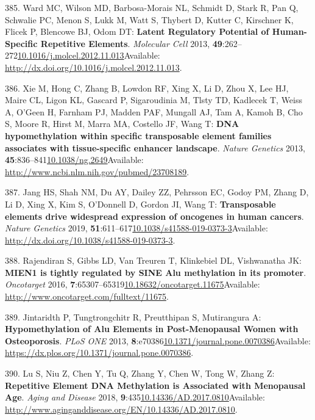 \documentclass[
]{book}
\begin{document}
\leavevmode\hypertarget{ref-Ward2013}{}%
385. Ward MC, Wilson MD, Barbosa-Morais NL, Schmidt D, Stark R, Pan Q, Schwalie PC, Menon S, Lukk M, Watt S, Thybert D, Kutter C, Kirschner K, Flicek P, Blencowe BJ, Odom DT: \textbf{Latent Regulatory Potential of Human-Specific Repetitive Elements}. \emph{Molecular Cell} 2013, \textbf{49}:262--272\href{https://doi.org/10.1016/j.molcel.2012.11.013}{10.1016/j.molcel.2012.11.013}Available: \url{http://dx.doi.org/10.1016/j.molcel.2012.11.013}.

\leavevmode\hypertarget{ref-Xie2013}{}%
386. Xie M, Hong C, Zhang B, Lowdon RF, Xing X, Li D, Zhou X, Lee HJ, Maire CL, Ligon KL, Gascard P, Sigaroudinia M, Tlsty TD, Kadlecek T, Weiss A, O'Geen H, Farnham PJ, Madden PAF, Mungall AJ, Tam A, Kamoh B, Cho S, Moore R, Hirst M, Marra MA, Costello JF, Wang T: \textbf{DNA hypomethylation within specific transposable element families associates with tissue-specific enhancer landscape}. \emph{Nature Genetics} 2013, \textbf{45}:836--841\href{https://doi.org/10.1038/ng.2649}{10.1038/ng.2649}Available: \url{http://www.ncbi.nlm.nih.gov/pubmed/23708189}.

\leavevmode\hypertarget{ref-Jang2019}{}%
387. Jang HS, Shah NM, Du AY, Dailey ZZ, Pehrsson EC, Godoy PM, Zhang D, Li D, Xing X, Kim S, O'Donnell D, Gordon JI, Wang T: \textbf{Transposable elements drive widespread expression of oncogenes in human cancers}. \emph{Nature Genetics} 2019, \textbf{51}:611--617\href{https://doi.org/10.1038/s41588-019-0373-3}{10.1038/s41588-019-0373-3}Available: \url{http://dx.doi.org/10.1038/s41588-019-0373-3}.

\leavevmode\hypertarget{ref-Rajendiran2016}{}%
388. Rajendiran S, Gibbs LD, Van Treuren T, Klinkebiel DL, Vishwanatha JK: \textbf{MIEN1 is tightly regulated by SINE Alu methylation in its promoter}. \emph{Oncotarget} 2016, \textbf{7}:65307--65319\href{https://doi.org/10.18632/oncotarget.11675}{10.18632/oncotarget.11675}Available: \url{http://www.oncotarget.com/fulltext/11675}.

\leavevmode\hypertarget{ref-Jintaridth2013}{}%
389. Jintaridth P, Tungtrongchitr R, Preutthipan S, Mutirangura A: \textbf{Hypomethylation of Alu Elements in Post-Menopausal Women with Osteoporosis}. \emph{PLoS ONE} 2013, \textbf{8}:e70386\href{https://doi.org/10.1371/journal.pone.0070386}{10.1371/journal.pone.0070386}Available: \url{https://dx.plos.org/10.1371/journal.pone.0070386}.

\leavevmode\hypertarget{ref-Lu2018a}{}%
390. Lu S, Niu Z, Chen Y, Tu Q, Zhang Y, Chen W, Tong W, Zhang Z: \textbf{Repetitive Element DNA Methylation is Associated with Menopausal Age}. \emph{Aging and Disease} 2018, \textbf{9}:435\href{https://doi.org/10.14336/AD.2017.0810}{10.14336/AD.2017.0810}Available: \url{http://www.aginganddisease.org/EN/10.14336/AD.2017.0810}.
\end{document}
